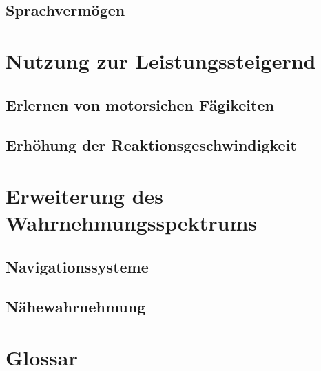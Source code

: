 \documentclass{llncs}
\begin{document}
\subsection{Sprachvermögen}
\section{Nutzung zur Leistungssteigernd}
\subsection{Erlernen von motorsichen Fägikeiten}
\subsection{Erhöhung der Reaktionsgeschwindigkeit}
\section{Erweiterung des Wahrnehmungsspektrums}
\subsection{Navigationssysteme}
\subsection{Nähewahrnehmung}

\clearpage
\section{Glossar}\label{glossar}

\renewcommand*{\glossarysection}[2][]{}	%
\printnoidxglossaries				%
\end{document}
